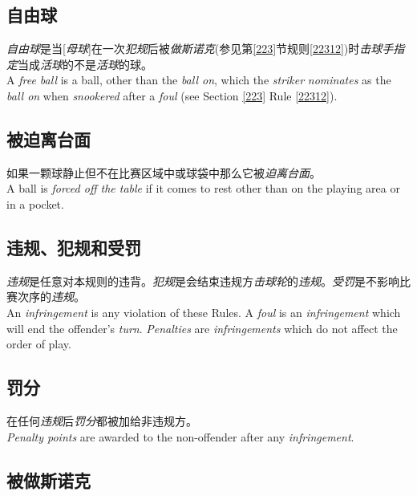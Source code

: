 \subsection{自由球}

\noindent \textit{自由球}是当[\textit{母球}]在一次\textit{犯规}后被\textit{做斯诺克}(参见第\ref{223}节规则\ref{22312})时\textit{击球手}\textit{指定}当成\textit{活球}的不是\textit{活球}的球。\\
A \textit{free ball} is a ball, other than the \textit{ball on}, which the \textit{striker} \textit{nominates} as the \textit{ball on} when \textit{snookered} after a \textit{foul} (see Section \ref{223} Rule \ref{22312}).

\subsection{被迫离台面}

\noindent 如果一颗球静止但不在比赛区域中或球袋中那么它被\textit{迫离台面}。\\
A ball is \textit{forced off the table} if it comes to rest other than on the 
playing area or in a pocket.

\subsection{违规、犯规和受罚}

\noindent \textit{违规}是任意对本规则的违背。\textit{犯规}是会结束违规方\textit{击球轮}的\textit{违规}。\textit{受罚}是不影响比赛次序的\textit{违规}。\\
An \textit{infringement} is any violation of these Rules. A \textit{foul} is an \textit{infringement} which will end the offender's \textit{turn}. \textit{Penalties} are \textit{infringements} which do not affect the order of play.

\subsection{罚分}

\noindent 在任何\textit{违规}后\textit{罚分}都被加给非违规方。\\
\textit{Penalty points} are awarded to the non-offender after any \textit{infringement}.

\subsection{被做斯诺克}\label{22217}

